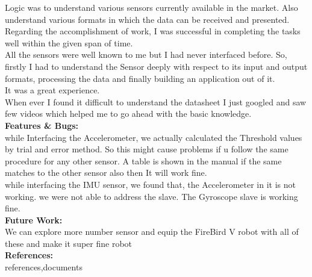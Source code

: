 \documentclass[a4paper,12 pt]{article}
\begin{document}
Logic was to understand various sensors currently available in the market. Also understand various formats in which the data can be received and presented.\\

Regarding the accomplishment of work, I was successful in completing the tasks well within the given span of time.\\

All the sensors were well known to me but I had never interfaced before. So, firstly I had to understand the Sensor deeply with respect to its input and output formats, processing the data and finally building an application out of it. \\

It was a great experience.\\

When ever I found it difficult to understand the datasheet I just googled and saw few videos which helped me to go ahead with the basic knowledge.
\\
 
\textbf{Features \& Bugs: }\\
while Interfacing the Accelerometer, we actually calculated the Threshold values by trial and error method. So this might cause problems if u follow the same procedure for any other sensor.
A table is shown in the manual if the same matches to the other sensor also then It will work fine.\\
while interfacing the IMU sensor, we found that, the Accelerometer in it is not working. we were not able to address the slave. The Gyroscope slave is working fine.
 \\
 
\textbf{Future Work: }\\We can explore more number sensor and equip the FireBird V robot with all of these and make it super fine robot\\
 
\textbf{References: }\\references,documents \\
\end{document}
